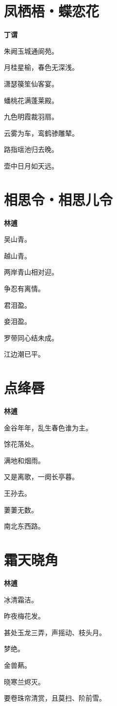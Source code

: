 \documentclass[12pt,a4paper]{ctexbook}
\begin{document}
\section{凤栖梧・蝶恋花}
\textbf{丁谓}\par\vspace{0.5em}
朱阙玉城通阆苑。\par
月桂星榆，春色无深浅。\par
潇瑟篌笙仙客宴。\par
蟠桃花满蓬莱殿。\par
九色明霞裁羽扇。\par
云雾为车，鸾鹤骖雕辇。\par
路指瑶池归去晚。\par
壶中日月如天远。\par

\section{相思令・相思儿令}
\textbf{林逋}\par\vspace{0.5em}
吴山青。\par
越山青。\par
两岸青山相对迎。\par
争忍有离情。\par
君泪盈。\par
妾泪盈。\par
罗带同心结未成。\par
江边潮已平。\par

\section{点绛唇}
\textbf{林逋}\par\vspace{0.5em}
金谷年年，乱生春色谁为主。\par
馀花落处。\par
满地和烟雨。\par
又是离歌，一阕长亭暮。\par
王孙去。\par
萋萋无数。\par
南北东西路。\par

\section{霜天晓角}
\textbf{林逋}\par\vspace{0.5em}
冰清霜洁。\par
昨夜梅花发。\par
甚处玉龙三弄，声摇动、枝头月。\par
梦绝。\par
金兽爇。\par
晓寒兰烬灭。\par
要卷珠帘清赏，且莫扫、阶前雪。\par
\end{document}

